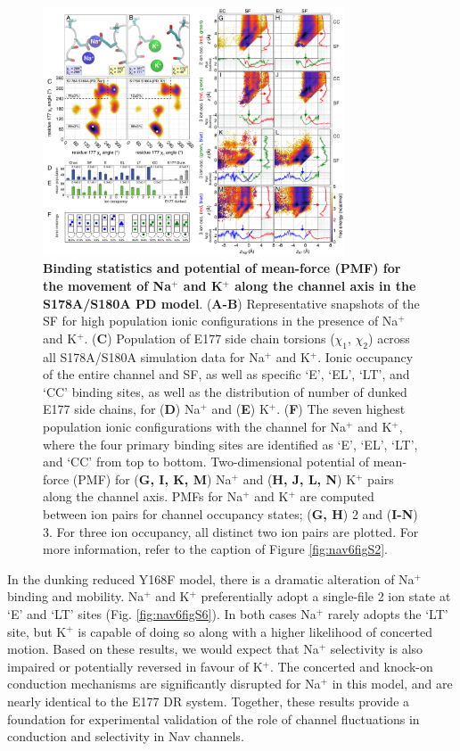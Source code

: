 \begin{refsection}
\begin{figure}[!ptb]
\centering
\includegraphics[width=0.8\textwidth]{nav6/Nav6FigS5}
\caption[Binding statistics and potential of mean-force (PMF) for the movement of Na$^+$ and K$^+$ along the channel axis in the S178A/S180A PD model]{ \textbf{Binding statistics and potential of mean-force (PMF) for the movement of Na$^+$ and K$^+$ along the channel axis in the S178A/S180A PD model}. (\textbf{A-B}) Representative snapshots of the SF for high population ionic configurations in the presence of Na$^+$ and K$^+$. (\textbf{C}) Population of E177 side chain torsions ($\chi_1$, $\chi_2$) across all S178A/S180A simulation data for Na$^+$ and K$^+$. Ionic occupancy of the entire channel and SF, as well as specific `E', `EL', `LT', and `CC' binding sites, as well as the distribution of number of dunked E177 side chains, for (\textbf{D}) Na$^+$ and (\textbf{E}) K$^+$. (\textbf{F}) The seven highest population ionic configurations with the channel for Na$^+$ and K$^+$, where the four primary binding sites are identified as `E', `EL', `LT', and `CC' from top to bottom. Two-dimensional potential of mean-force (PMF) for (\textbf{G, I, K, M}) Na$^+$ and (\textbf{H, J, L, N}) K$^+$ pairs along the channel axis. PMFs for Na$^+$ and K$^+$ are computed between ion pairs for channel occupancy states; (\textbf{G, H}) 2 and (\textbf{I-N}) 3. For three ion occupancy, all distinct two ion pairs are plotted. For more information, refer to the caption of Figure \ref{fig:nav6figS2}.}
\label{fig:nav6figS5}
\end{figure}

In the dunking reduced Y168F model, there is a dramatic alteration of Na$^+$ binding and mobility. Na$^+$ and K$^+$ preferentially adopt a single-file 2 ion state at `E' and `LT' sites (Fig. \ref{fig:nav6figS6}). In both cases Na$^+$ rarely adopts the `LT' site, but K$^+$ is capable of doing so along with a higher likelihood of concerted motion. Based on these results, we would expect that Na$^+$ selectivity is also impaired or potentially reversed in favour of K$^+$. The concerted and knock-on conduction mechanisms are significantly disrupted for Na$^+$ in this model, and are nearly identical to the E177 DR system. Together, these results provide a foundation for experimental validation of the role of channel fluctuations in conduction and selectivity in Nav channels.


\end{refsection}
